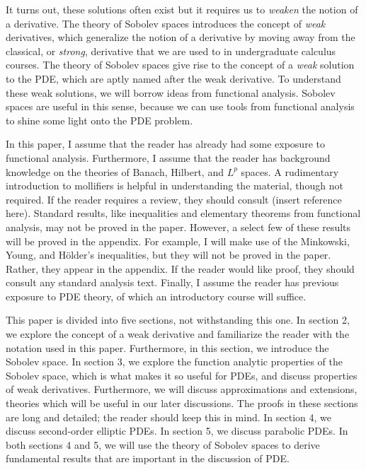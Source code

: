\documentclass[10pt]{article}
\begin{document}
It turns out, these solutions often exist but it requires us to \textit{weaken} the notion of a derivative. The theory of Sobolev spaces introduces the concept of \textit{weak} derivatives, which generalize the notion of a derivative by moving away from the classical, or \textit{strong}, derivative that we are used to in undergraduate calculus courses. The theory of Sobolev spaces give rise to the concept of a \textit{weak} solution to the PDE, which are aptly named after the weak derivative. To understand these weak solutions, we will borrow ideas from functional analysis. Sobolev spaces are useful in this sense, because we can use tools from functional analysis to shine some light onto the PDE problem. 

In this paper, I assume that the reader has already had some exposure to functional analysis. Furthermore, I assume that the reader has background knowledge on the theories of Banach, Hilbert, and $L^p$ spaces. A rudimentary introduction to mollifiers is helpful in understanding the material, though not required. If the reader requires a review, they should consult (insert reference here). Standard results, like inequalities and elementary theorems from functional analysis, may not be proved in the paper. However, a select few of these results will be proved in the appendix. For example, I will make use of the Minkowski, Young, and H\"older's inequalities, but they will not be proved in the paper. Rather, they appear in the appendix. If the reader would like proof, they should consult any standard analysis text. Finally, I assume the reader has previous exposure to PDE theory, of which an introductory course will suffice.  

This paper is divided into five sections, not withstanding this one. In section 2, we explore the concept of a weak derivative and familiarize the reader with the notation used in this paper. Furthermore, in this section, we introduce the Sobolev space. In section 3, we explore the function analytic properties of the Sobolev space, which is what makes it so useful for PDEs, and discuss properties of weak derivatives. Furthermore, we will discuss approximations and extensions, theories which will be useful in our later discussions. The proofs in these sections are long and detailed; the reader should keep this in mind. In section 4, we discuss second-order elliptic PDEs. In section 5, we discuss parabolic PDEs. In both sections 4 and 5, we will use the theory of Sobolev spaces to derive fundamental results that are important in the discussion of PDE. 
\end{document}

